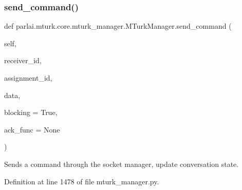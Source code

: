 \mbox{\label{classparlai_1_1mturk_1_1core_1_1mturk__manager_1_1MTurkManager_aee5b70ddae99ec326b6c512c29f740a3}} 
\subsubsection{\texorpdfstring{send\+\_\+command()}{send\_command()}}
{\footnotesize\ttfamily def parlai.\+mturk.\+core.\+mturk\+\_\+manager.\+M\+Turk\+Manager.\+send\+\_\+command (\begin{DoxyParamCaption}\item[{}]{self,  }\item[{}]{receiver\+\_\+id,  }\item[{}]{assignment\+\_\+id,  }\item[{}]{data,  }\item[{}]{blocking = {\ttfamily True},  }\item[{}]{ack\+\_\+func = {\ttfamily None} }\end{DoxyParamCaption})}

\begin{DoxyVerb}Sends a command through the socket manager, update conversation state.
\end{DoxyVerb}
 

Definition at line 1478 of file mturk\+\_\+manager.\+py.


